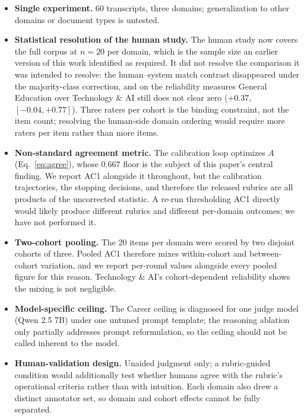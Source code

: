 \documentclass[letterpaper]{article}
\begin{document}
\begin{itemize}
\item \textbf{Single experiment.} 60 transcripts, three domains;
      generalization to other domains or document types is untested.
\item \textbf{Statistical resolution of the human study.} The human study now
      covers the full corpus at $n=20$ per domain, which is the sample size an
      earlier version of this work identified as required. It did not resolve
      the comparison it was intended to resolve: the human--system match
      contrast disappeared under the majority-class correction, and on the
      reliability measures General Education over Technology \& AI still does
      not clear zero ($+0.37$, $[-0.04, +0.77]$). Three raters per cohort is
      the binding constraint, not the item count; resolving the human-side
      domain ordering would require more raters per item rather than more
      items.
\item \textbf{Non-standard agreement metric.} The calibration loop optimizes
      $A$ (Eq.~\ref{eq:agree}), whose $0.667$ floor is the subject of this
      paper's central finding. We report AC1 alongside it throughout, but the
      calibration trajectories, the stopping decisions, and therefore the
      released rubrics are all products of the uncorrected statistic. A
      re-run thresholding AC1 directly would likely produce different
      rubrics and different per-domain outcomes; we have not performed it.
\item \textbf{Two-cohort pooling.} The 20 items per domain were scored by two
      disjoint cohorts of three. Pooled AC1 therefore mixes within-cohort and
      between-cohort variation, and we report per-round values alongside every
      pooled figure for this reason. Technology \& AI's cohort-dependent
      reliability shows the mixing is not negligible.
\item \textbf{Model-specific ceiling.} The Career ceiling is diagnosed for one
      judge model (Qwen 2.5 7B) under one untuned prompt template; the
      reasoning ablation only partially addresses prompt reformulation, so the
      ceiling should not be called inherent to the model.
\item \textbf{Human-validation design.} Unaided judgment only; a
      rubric-guided condition would additionally test whether humans agree
      with the rubric's operational criteria rather than with intuition. Each
      domain also drew a distinct annotator set, so domain and cohort effects
      cannot be fully separated.

\end{itemize}
\end{document}
